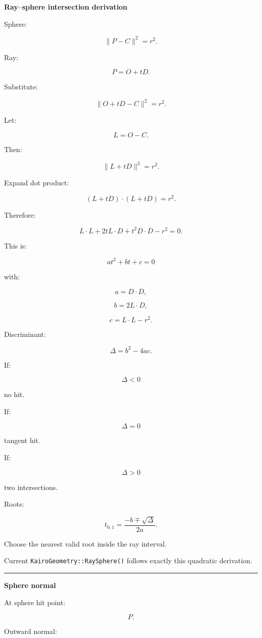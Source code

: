 \textbf{Ray--sphere intersection derivation}

Sphere:

\[
\|P-C\|^2=r^2.
\]

Ray:

\[
P=O+tD.
\]

Substitute:

\[
\|O+tD-C\|^2=r^2.
\]

Let:

\[
L=O-C.
\]

Then:

\[
\|L+tD\|^2=r^2.
\]

Expand dot product:

\[
(L+tD)\cdot(L+tD)=r^2.
\]

Therefore:

\[
L\cdot L
+
2tL\cdot D
+
t^2D\cdot D
-
r^2
=
0.
\]

This is:

\[
\boxed{
at^2+bt+c=0
}
\]

with:

\[
a=D\cdot D,
\]

\[
b=2L\cdot D,
\]

\[
c=L\cdot L-r^2.
\]

Discriminant:

\[
\Delta=b^2-4ac.
\]

If:

\[
\Delta<0
\]

no hit.

If:

\[
\Delta=0
\]

tangent hit.

If:

\[
\Delta>0
\]

two intersections.

Roots:

\[
\boxed{
t_{0,1}
=
\frac{-b\mp\sqrt{\Delta}}{2a}.
}
\]

Choose the nearest valid root inside the ray interval.

Current \texttt{KairoGeometry::RaySphere()} follows exactly this quadratic derivation.

\begin{center}\rule{0.5\linewidth}{0.5pt}\end{center}

\textbf{Sphere normal}

At sphere hit point:

\[
P.
\]

Outward normal:

